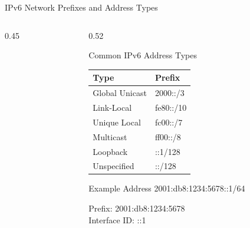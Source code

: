 \documentclass[aspectratio=169]{beamer}  %
\begin{document}
\begin{frame}{IPv6 Network Prefixes and Address Types}
\begin{columns}[T]
\begin{column}{0.45\textwidth}
\begin{center}
            \end{center}
        \end{column}
        \begin{column}{0.52\textwidth}
            \begin{block}{Common IPv6 Address Types}
                \small
                \begin{tabular}{l l}
                    \toprule
                    \textbf{Type} & \textbf{Prefix} \\
                    \midrule
                    Global Unicast & 2000::/3 \\
                    Link-Local & fe80::/10 \\
                    Unique Local & fc00::/7 \\
                    Multicast & ff00::/8 \\
                    Loopback & ::1/128 \\
                    Unspecified & ::/128 \\
                    \bottomrule
                \end{tabular}
            \end{block}
            
            \vspace{0.2em}
            \begin{exampleblock}{Example Address}
                \ttfamily\small
                2001:db8:1234:5678::1/64
                
                \vspace{0.2em}
                \normalfont\small
                Prefix: 2001:db8:1234:5678 \\
                Interface ID: ::1
            \end{exampleblock}
        \end{column}
    \end{columns}
\end{frame}
\end{document}
